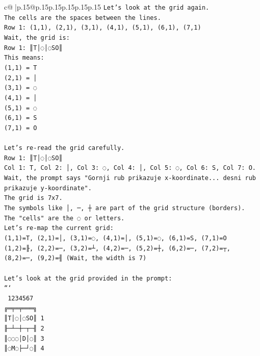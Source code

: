 \documentclass{article}
\begin{document}
{\begin{supertabular}{c@{$\;$}|p{.15\linewidth}@{}p{.15\linewidth}p{.15\linewidth}p{.15\linewidth}p{.15\linewidth}p{.15\linewidth}}
{{{\texttt{Let's look at the grid again.} \\
\texttt{The cells are the spaces between the lines.} \\
\texttt{Row 1: (1,1), (2,1), (3,1), (4,1), (5,1), (6,1), (7,1)} \\
\texttt{Wait, the grid is:} \\
\texttt{Row 1: ║T│◌│◌SO║} \\
\texttt{This means:} \\
\texttt{(1,1) = T} \\
\texttt{(2,1) = │} \\
\texttt{(3,1) = ◌} \\
\texttt{(4,1) = │} \\
\texttt{(5,1) = ◌} \\
\texttt{(6,1) = S} \\
\texttt{(7,1) = O} \\
\\ 
\texttt{Let's re{-}read the grid carefully.} \\
\texttt{Row 1: ║T│◌│◌SO║} \\
\texttt{Col 1: T, Col 2: │, Col 3: ◌, Col 4: │, Col 5: ◌, Col 6: S, Col 7: O.} \\
\texttt{Wait, the prompt says "Gornji rub prikazuje x{-}koordinate... desni rub prikazuje y{-}koordinate".} \\
\texttt{The grid is 7x7.} \\
\texttt{The symbols like │, ─, ┼ are part of the grid structure (borders).} \\
\texttt{The "cells" are the ◌ or letters.} \\
\texttt{Let's re{-}map the current grid:} \\
\texttt{(1,1)=T, (2,1)=│, (3,1)=◌, (4,1)=│, (5,1)=◌, (6,1)=S, (7,1)=O} \\
\texttt{(1,2)=╟, (2,2)=─, (3,2)=┴, (4,2)=─, (5,2)=┼, (6,2)=─, (7,2)=┬, (8,2)=─, (9,2)=╢ (Wait, the width is 7)} \\
\\ 
\texttt{Let's look at the grid provided in the prompt:} \\
\texttt{```} \\
\texttt{ 1234567} \\
\texttt{╔═╤═╤═══╗} \\
\texttt{║T│◌│◌SO║ 1} \\
\texttt{╟─┴─┼─┬─╢ 2} \\
\texttt{║◌◌◌│D│◌║ 3} \\
\texttt{║◌M◌├─┘◌║ 4} \\
}}}
\end{supertabular}}
\end{document}
